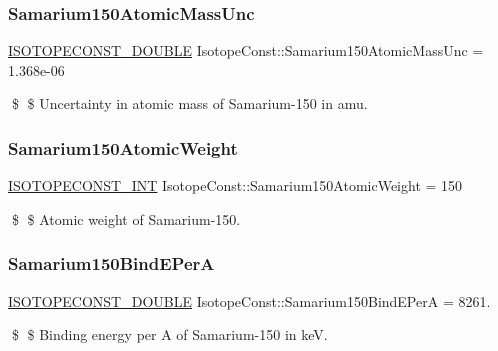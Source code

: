 \subsubsection{\texorpdfstring{Samarium150\+Atomic\+Mass\+Unc}{Samarium150AtomicMassUnc}}
{\footnotesize\ttfamily \mbox{\hyperlink{group___isotope_const-_macros_ga8f45a7272ce02c0b4c65c44636ed719a}{I\+S\+O\+T\+O\+P\+E\+C\+O\+N\+S\+T\+\_\+\+D\+O\+U\+B\+LE}} Isotope\+Const\+::\+Samarium150\+Atomic\+Mass\+Unc = 1.\+368e-\/06}

\$ \$ Uncertainty in atomic mass of Samarium-\/150 in amu. \mbox{\label{group___isotope_const-_samarium-_sm150_ga6a29ae54098bed79cd80885899a5f284}} 
\subsubsection{\texorpdfstring{Samarium150\+Atomic\+Weight}{Samarium150AtomicWeight}}
{\footnotesize\ttfamily \mbox{\hyperlink{group___isotope_const-_macros_ga5f18360b3e99483a35c32d789e62621c}{I\+S\+O\+T\+O\+P\+E\+C\+O\+N\+S\+T\+\_\+\+I\+NT}} Isotope\+Const\+::\+Samarium150\+Atomic\+Weight = 150}

\$ \$ Atomic weight of Samarium-\/150. \mbox{\label{group___isotope_const-_samarium-_sm150_gaef3a0e0c1876f2f5ffff2baab481cad2}} 
\subsubsection{\texorpdfstring{Samarium150\+Bind\+E\+PerA}{Samarium150BindEPerA}}
{\footnotesize\ttfamily \mbox{\hyperlink{group___isotope_const-_macros_ga8f45a7272ce02c0b4c65c44636ed719a}{I\+S\+O\+T\+O\+P\+E\+C\+O\+N\+S\+T\+\_\+\+D\+O\+U\+B\+LE}} Isotope\+Const\+::\+Samarium150\+Bind\+E\+PerA = 8261.}

\$ \$ Binding energy per A of Samarium-\/150 in keV. \mbox{\label{group___isotope_const-_samarium-_sm150_gaf7fe38e8e255736b6ff42925857ccfe4}} 

